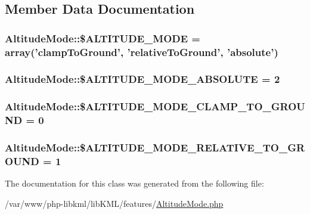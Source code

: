 \subsection{Member Data Documentation}
\hypertarget{classAltitudeMode_a29c5122f255fb163e5b1335a61dc47b5}{
\subsubsection[{\$ALTITUDE\_\-MODE}]{\setlength{\rightskip}{0pt plus 5cm}AltitudeMode::\$ALTITUDE\_\-MODE = array('clampToGround', 'relativeToGround', 'absolute')}}
\label{de/da2/classAltitudeMode_a29c5122f255fb163e5b1335a61dc47b5}
\hypertarget{classAltitudeMode_ab6a66434b3d8ee7da69c04196e12ec5c}{
\subsubsection[{\$ALTITUDE\_\-MODE\_\-ABSOLUTE}]{\setlength{\rightskip}{0pt plus 5cm}AltitudeMode::\$ALTITUDE\_\-MODE\_\-ABSOLUTE = 2}}
\label{de/da2/classAltitudeMode_ab6a66434b3d8ee7da69c04196e12ec5c}
\hypertarget{classAltitudeMode_a4a763be1a8e1087ff82f9c517f480f67}{
\subsubsection[{\$ALTITUDE\_\-MODE\_\-CLAMP\_\-TO\_\-GROUND}]{\setlength{\rightskip}{0pt plus 5cm}AltitudeMode::\$ALTITUDE\_\-MODE\_\-CLAMP\_\-TO\_\-GROUND = 0}}
\label{de/da2/classAltitudeMode_a4a763be1a8e1087ff82f9c517f480f67}
\hypertarget{classAltitudeMode_ac76fe66f1ae2d6fc3490cfdccba2b81d}{
\subsubsection[{\$ALTITUDE\_\-MODE\_\-RELATIVE\_\-TO\_\-GROUND}]{\setlength{\rightskip}{0pt plus 5cm}AltitudeMode::\$ALTITUDE\_\-MODE\_\-RELATIVE\_\-TO\_\-GROUND = 1}}
\label{de/da2/classAltitudeMode_ac76fe66f1ae2d6fc3490cfdccba2b81d}


The documentation for this class was generated from the following file:\begin{DoxyCompactItemize}
\item 
/var/www/php-\/libkml/libKML/features/\hyperlink{AltitudeMode_8php}{AltitudeMode.php}\end{DoxyCompactItemize}
